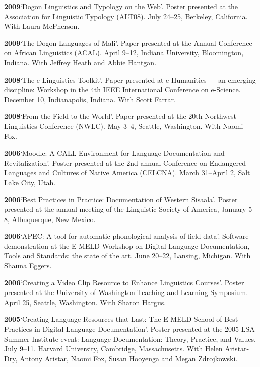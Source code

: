 \documentclass[11pt]{article}
\newcommand{\hangpara}{
 \setlength{\parindent}{0in} %
 \hangindent=0.42in %
}
\begin{document}
\vskip 6pt
\hangpara
{\bf 2009}\hspace{1ex}`Dogon Linguistics and Typology on the Web'. Poster presented at the Association for Linguistic Typology (ALT08). July 24--25, Berkeley, California. With Laura McPherson.

\vskip 6pt
\hangpara
{\bf 2009}\hspace{1ex}`The Dogon Languages of Mali'. Paper presented at the Annual Conference on African Linguistics (ACAL). April 9--12, Indiana University, Bloomington, Indiana. With Jeffrey Heath and Abbie Hantgan.

\vskip 6pt
\hangpara
{\bf 2008}\hspace{1ex}`The e-Linguistics Toolkit'. Paper presented at e-Humanities --- an emerging discipline: Workshop in the 4th IEEE International Conference on e-Science. December 10, Indianapolis, Indiana. With Scott Farrar.

\vskip 6pt
\hangpara
{\bf 2008}\hspace{1ex}`From the Field to the World'. Paper presented at the 20th Northwest Linguistics Conference (NWLC). May 3--4, Seattle, Washington. With Naomi Fox.

\vskip 6pt
\hangpara
{\bf 2006}\hspace{1ex}`Moodle: A CALL Environment for Language Documentation and Revitalization'. Poster presented at the 2nd annual Conference on Endangered Languages and Cultures of Native America (CELCNA). March 31--April 2, Salt Lake City, Utah.

\vskip 6pt
\hangpara
{\bf 2006}\hspace{1ex}`Best Practices in Practice: Documentation of Western Sisaala'. Poster presented at the annual meeting of the Linguistic Society of America, January 5--8, Albuquerque, New Mexico.

\vskip 6pt
\hangpara
{\bf 2006}\hspace{1ex}`APEC: A tool for automatic phonological analysis of field data'. Software demonstration at the E-MELD Workshop on Digital Language Documentation, Tools and Standards: the state of the art. June 20--22, Lansing, Michigan. With Shauna Eggers.

\vskip 6pt
\hangpara
{\bf 2006}\hspace{1ex}`Creating a Video Clip Resource to Enhance Linguistics Courses'. Poster presented at the University of Washington Teaching and Learning Symposium. April 25, Seattle, Washington. With Sharon Hargus.

\vskip 6pt
\hangpara
{\bf 2005}\hspace{1ex}`Creating Language Resources that Last: The E-MELD School of Best Practices in Digital Language Documentation'. Poster presented at the 2005 LSA Summer Institute event: Language Documentation: Theory, Practice, and Values. July 9--11. Harvard University, Cambridge, Massachusetts. With Helen Aristar-Dry, Antony Aristar, Naomi Fox, Susan Hooyenga and Megan Zdrojkowski.
\end{document}

